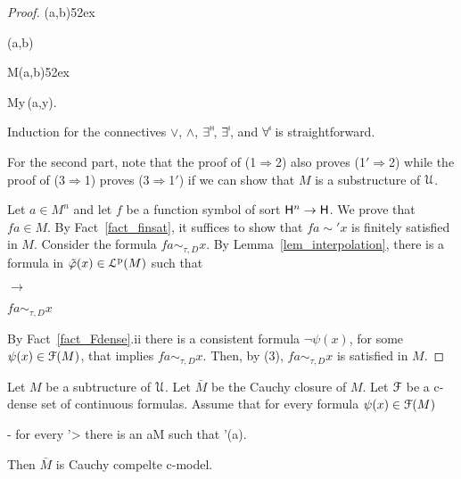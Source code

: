 \documentclass[10pt,oneside]{amsproc}
\def\forallH{\forall}
\begin{document}
{\begin{proof}
  \ceq{}
  {\Rightarrow}
  {\neg\psi(a,b)}\hfill{}\kern52ex
  
  \ceq{}
  {\Rightarrow}
  {\neg\varphi(a,b)}
  
  \ceq{}
  {\Rightarrow}
  {M\models\neg\varphi(a,b)}\hfill{}\kern52ex

  \ceq{}
  {\Rightarrow}
  {M\not\models\forallH y\,\varphi(a,y).}

  Induction for the connectives $\vee$, $\wedge$, $\exists\raisebox{1.1ex}{\scaleto{\sf H}{.8ex}\kern-.2ex}$, $\exists\raisebox{1.1ex}{\scaleto{\sf I}{.8ex}\kern-.2ex}$, and $\forall\raisebox{1.1ex}{\scaleto{\sf I}{.8ex}\kern-.2ex}$ is straightforward.

  For the second part, note that the proof of (1$\Rightarrow$2) also proves (1$'\Rightarrow$2) while the proof of (3$\Rightarrow$1) proves (3$\Rightarrow$1$'$) if we can show that $M$ is a substructure of ${\EuScript U}$.
  
  Let $a\in M^{n}$ and let $f$ be a function symbol of sort ${\sf H}^{n}\to{\sf H}$.
  We prove that $fa\in M$.
  By Fact~\ref{fact_finsat}, it suffices to show that $fa\sim' x$ is finitely satisfied in $M$.
  Consider the formula $fa\sim_{\tau,D} x$.
  By Lemma~\ref{lem_interpolation}, there is a formula in $\tilde{\varphi}(x)\in{\EuScript L}^{\rm p}(M)$ such that
  
  \parbox{6ex}{\hfil$\rightarrow$}$fa\sim_{\tau,D} x$

  By Fact~\ref{fact_Fdense}.ii there is a consistent formula  $\neg\psi(x)$, for some $\psi(x)\in{\EuScript F}(M)$, that implies $fa\sim_{\tau,D} x$.
  Then, by (3), $fa\sim_{\tau,D} x$ is satisfied in $M$.
\end{proof}


\begin{proposition}\label{prop_Cauchycompletion}
  Let $M$ be a subtructure of ${\EuScript U}$.
  Let $\bar M$ be the Cauchy closure of $M$. 
  Let ${\EuScript F}$ be a c-dense set of continuous formulas.
  Assume that for every formula $\psi(x)\in{\EuScript F}(M)$
    
    \noindent\kern-\leftmargin
    {\textrm{ for every }\psi'>\psi\textrm{ there is an }a\in M\textrm{ such that }\psi'(a).}
  
  Then $\bar M$ is Cauchy compelte c-model.
\end{proposition}

}
\end{document}
